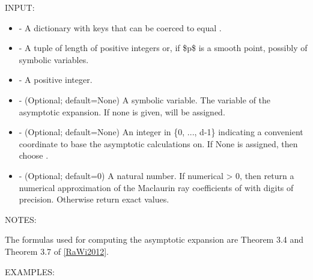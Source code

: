 \documentclass[letterpaper,12pt,openany,oneside]{sphinxmanual}
\begin{document}
\begin{fulllineitems}
\begin{fulllineitems}
INPUT:
\begin{itemize}
\item {} 
 - A dictionary with keys that can be coerced to equal
.

\item {} 
 - A tuple of length  of
positive integers or, if \$p\$ is a smooth point,
possibly of symbolic variables.

\item {} 
 - A positive integer.

\item {} 
 - (Optional; default=None) A symbolic variable.
The variable of the asymptotic expansion.
If none is given,  will be assigned.

\item {} 
- (Optional; default=None) An integer in
\{0, ..., d-1\} indicating a convenient coordinate to base
the asymptotic calculations on.
If None is assigned, then choose .

\item {} 
 - (Optional; default=0) A natural number.
If numerical \textgreater{} 0, then return a numerical approximation of the
Maclaurin ray coefficients of  with  digits
of precision.
Otherwise return exact values.

\end{itemize}

NOTES:

The formulas used for computing the asymptotic expansion are
Theorem 3.4 and Theorem 3.7 of {\hyperref[amgf:rawi2012]{{[}RaWi2012{]}}}.

EXAMPLES:


\end{fulllineitems}
\end{fulllineitems}
\end{document}
